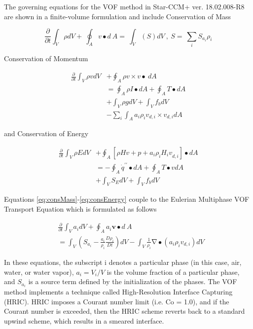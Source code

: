 \documentclass{UCF_ETD}
\begin{document}
The governing equations for the VOF method in Star-CCM+ ver. 18.02.008-R8 \cite{starccm} are shown in a finite-volume formulation and include Conservation of Mass

\begin{equation}
\label{eq:consMass}
    \frac{\partial}{\partial t}\int_{V}\rho dV+\ \oint_{A}{v\bullet d\ A}=\ \int_{V}\left(S\right)dV\ ,\ S=\ \sum_{i}{S_{a_i}\rho_i}
\end{equation}

\noindent Conservation of Momentum

\begin{align}
    \label{eq:consMomentum}
        \frac{\partial}{\partial t}\int_{V}\rho vdV &+ \oint_{A}{\rho v\times v}\bullet\ dA \\
        &= \oint_{A}{\rho I\bullet dA} + \oint_{A}{T\bullet dA} \nonumber \\
        &+ \int_{V}\rho gdV + \int_{V}{f_bdV} \nonumber \\
        &- \sum_{i}\int_{A}{a_i\rho_iv_{d,i}\times v_{d,i}dA} \nonumber
\end{align}

\noindent and Conservation of Energy

\begin{align}
    \label{eq:consEnergy}
        \frac{\partial}{\partial t}\int_{V}\rho EdV &+ \oint_{A}\left[\rho Hv+p+a_i\rho_i{H_iv}_{d,i}\right]\bullet dA \\
        &= -\oint_{A}{{\dot{q}}^{\prime\prime}\bullet dA}+ \oint_{A}{T\bullet v d A} \nonumber\\
        &+ \int_{V}{S_EdV} + \int_{V}{f_bdV} \nonumber
\end{align}

\noindent Equations \ref{eq:consMass}-\ref{eq:consEnergy} couple to the Eulerian Multiphase VOF Transport Equation which is formulated as follows 



\begin{align}
    \label{eq:VOFtrans}
        &\frac{\partial}{\partial t}\int_{V}{a_idV} + \oint_{A}{a_{i}\textbf{v}\bullet d\ A} \\
        &= \int_{V}{\left(S_{a_i}-\frac{a_i}{\rho_{i}}\frac{D\rho_{i}}{Dt} \right) dV} - \int_{V}{\frac{1}{\rho_{i}}\mathrm{\nabla}\bullet}\left(a_i\rho_{i}v_{d,i}\right)dV \nonumber
\end{align}


\noindent In these equations, the subscript i denotes a particular phase (in this case, air, water, or water vapor), $a_{i} = V_{i}/V$ is the volume fraction of a particular phase, and $S_{a_{i}}$ is a source term defined by the initialization of the phases. The VOF method implements a technique called High-Resolution Interface Capturing (HRIC). HRIC imposes a Courant number limit (i.e. Co = 1.0), and if the Courant number is exceeded, then the HRIC scheme reverts back to a standard upwind scheme, which results in a smeared interface. 
\end{document}
